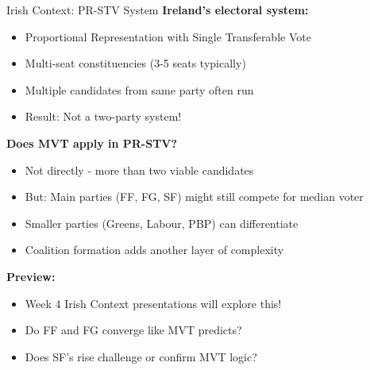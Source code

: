 \documentclass[10pt]{beamer}
\begin{document}
\begin{frame}{Irish Context: PR-STV System}
\textbf{Ireland's electoral system:}
\begin{itemize}
\item Proportional Representation with Single Transferable Vote
\item Multi-seat constituencies (3-5 seats typically)
\item Multiple candidates from same party often run
\item Result: \alert{Not a two-party system!}
\end{itemize}



\textbf{Does MVT apply in PR-STV?}
\begin{itemize}
\item Not directly - more than two viable candidates
\item But: Main parties (FF, FG, SF) might still compete for median voter
\item Smaller parties (Greens, Labour, PBP) can differentiate
\item Coalition formation adds another layer of complexity
\end{itemize}



\textbf{Preview:}
\begin{itemize}
\item Week 4 Irish Context presentations will explore this!
\item Do FF and FG converge like MVT predicts?
\item Does SF's rise challenge or confirm MVT logic?
\end{itemize}
\end{frame}
\end{document}

